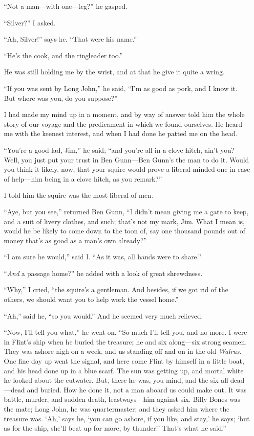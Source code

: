 \enquote{Not a man---with one---leg?} he gasped.

\enquote{Silver?} I asked.

\enquote{Ah, Silver!} says he. \enquote{That were his name.}

\enquote{He’s the cook, and the ringleader too.}

He was still holding me by the wrist, and at that he give it quite a wring.

\enquote{If you was sent by Long John,} he said, \enquote{I’m as good as pork, and I know it. But where was you, do you suppose?}

I had made my mind up in a moment, and by way of answer told him the whole story of our voyage and the predicament in which we found ourselves. He heard me with the keenest interest, and when I had done he patted me on the head.

\enquote{You’re a good lad, Jim,} he said; \enquote{and you’re all in a clove hitch, ain’t you? Well, you just put your trust in Ben Gunn---Ben Gunn’s the man to do it. Would you think it likely, now, that your squire would prove a liberal-minded one in case of help---him being in a clove hitch, as you remark?}

I told him the squire was the most liberal of men.

\enquote{Aye, but you see,} returned Ben Gunn, \enquote{I didn’t mean giving me a gate to keep, and a suit of livery clothes, and such; that’s not my mark, Jim. What I mean is, would he be likely to come down to the toon of, say one thousand pounds out of money that’s as good as a man’s own already?}

\enquote{I am sure he would,} said I. \enquote{As it was, all hands were to share.}

\enquote{\textit{And} a passage home?} he added with a look of great shrewdness.

\enquote{Why,} I cried, \enquote{the squire’s a gentleman. And besides, if we got rid of the others, we should want you to help work the vessel home.}

\enquote{Ah,} said he, \enquote{so you would.} And he seemed very much relieved.

\enquote{Now, I’ll tell you what,} he went on. \enquote{So much I’ll tell you, and no more. I were in Flint’s ship when he buried the treasure; he and six along---six strong seamen. They was ashore nigh on a week, and us standing off and on in the old \textit{Walrus}. One fine day up went the signal, and here come Flint by himself in a little boat, and his head done up in a blue scarf. The sun was getting up, and mortal white he looked about the cutwater. But, there he was, you mind, and the six all dead---dead and buried. How he done it, not a man aboard us could make out. It was battle, murder, and sudden death, leastways---him against six. Billy Bones was the mate; Long John, he was quartermaster; and they asked him where the treasure was. \enquote{Ah,} says he, \enquote{you can go ashore, if you like, and stay,} he says; \enquote{but as for the ship, she’ll beat up for more, by thunder!} That’s what he said.}

